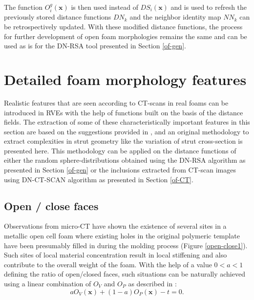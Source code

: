 The function $ O_i^g(\textbf{x}) $ is then used instead of $ DS_i(\textbf{x}) $ and is used to refresh the previously stored distance functions $ DN_k $ and the neighbor identity map $ NN_k $ can be retrospectively updated. With these modified distance functions, the process for further development of open foam morphologies remains the same and can be used as is for the DN-RSA tool presented in Section \ref{of-gen}.

\section{Detailed foam morphology features}\label{of-feature}
Realistic features that are seen according to CT-scans in real foams can be introduced in RVEs with the help of functions built on the basis of the distance fields. The extraction of some of these characteristically important features in this section are based on the  suggestions provided in \cite{sononAdvancedTechniquesGeneration2014}, and an original methodology to extract complexities in strut geometry like the variation of strut cross-section is presented here. This methodology can be applied on the distance functions of either the random sphere-distributions obtained using the DN-RSA algorithm as presented in Section \ref{of-gen} or the inclusions extracted from CT-scan images using DN-CT-SCAN algorithm as presented in Section \ref{of-CT}.

\subsection{Open / close faces}\label{of-feature-open}
Observations from micro-CT have shown the existence of several sites in a metallic open cell foam where existing holes in the original polymeric template have been presumably filled in during the molding process (Figure \ref{open-close1})\cite{jangMicrostructureOpencellFoams2008}.  Such sites of local material concentration result in local stiffening and also contribute to the overall weight of the foam. 
With the help of a value $ 0<a<1 $ defining the ratio of open/closed faces, such situations can be naturally achieved using a linear combination of $ O_V $ and $ O_P $ as described in \cite{sononAdvancedApproachGeneration2015}:
\begin{equation}
aO_V(\textbf{x})+(1-a)O_P(\textbf{x})-t=0.
\end{equation}


